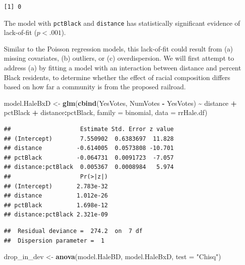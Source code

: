 \documentclass[
]{krantz}
\newenvironment{Shaded}{\begin{snugshade}}{\end{snugshade}}
\newcommand{\AttributeTok}[1]{\textcolor[rgb]{0.27,0.27,0.27}{#1}}
\newcommand{\FunctionTok}[1]{\textcolor[rgb]{0.27,0.27,0.27}{\textbf{#1}}}
\newcommand{\NormalTok}[1]{#1}
\newcommand{\OtherTok}[1]{\textcolor[rgb]{0.37,0.37,0.37}{#1}}
\newcommand{\SpecialCharTok}[1]{\textcolor[rgb]{0.43,0.43,0.43}{\textbf{#1}}}
\newcommand{\StringTok}[1]{\textcolor[rgb]{0.5,0.5,0.5}{#1}}
\begin{document}
\begin{verbatim}
[1] 0
\end{verbatim}

The model with \texttt{pctBlack} and \texttt{distance} has statistically significant evidence of lack-of-fit (\(p<.001\)).

Similar to the Poisson regression models, this lack-of-fit  could result from (a) missing covariates, (b) outliers, or (c) overdispersion. We will first attempt to address (a) by fitting a model with an interaction between distance and percent Black residents, to determine whether the effect of racial composition differs based on how far a community is from the proposed railroad.

\begin{Shaded}
\begin{Highlighting}[]
\NormalTok{model.HaleBxD }\OtherTok{\textless{}{-}} \FunctionTok{glm}\NormalTok{(}\FunctionTok{cbind}\NormalTok{(YesVotes, NumVotes }\SpecialCharTok{{-}}\NormalTok{ YesVotes) }\SpecialCharTok{\textasciitilde{}}
\NormalTok{  distance }\SpecialCharTok{+}\NormalTok{ pctBlack }\SpecialCharTok{+}\NormalTok{ distance}\SpecialCharTok{:}\NormalTok{pctBlack, }
  \AttributeTok{family =}\NormalTok{ binomial, }\AttributeTok{data =}\NormalTok{ rrHale.df)}
\end{Highlighting}
\end{Shaded}

\begin{verbatim}
##                    Estimate Std. Error z value
## (Intercept)        7.550902  0.6383697  11.828
## distance          -0.614005  0.0573808 -10.701
## pctBlack          -0.064731  0.0091723  -7.057
## distance:pctBlack  0.005367  0.0008984   5.974
##                    Pr(>|z|)
## (Intercept)       2.783e-32
## distance          1.012e-26
## pctBlack          1.698e-12
## distance:pctBlack 2.321e-09
\end{verbatim}

\begin{verbatim}
##  Residual deviance =  274.2  on  7 df 
##  Dispersion parameter =  1
\end{verbatim}

\begin{Shaded}
\begin{Highlighting}[]
\NormalTok{drop\_in\_dev }\OtherTok{\textless{}{-}} \FunctionTok{anova}\NormalTok{(model.HaleBD, model.HaleBxD, }
                     \AttributeTok{test =} \StringTok{"Chisq"}\NormalTok{)}
\end{Highlighting}
\end{Shaded}
\end{document}
